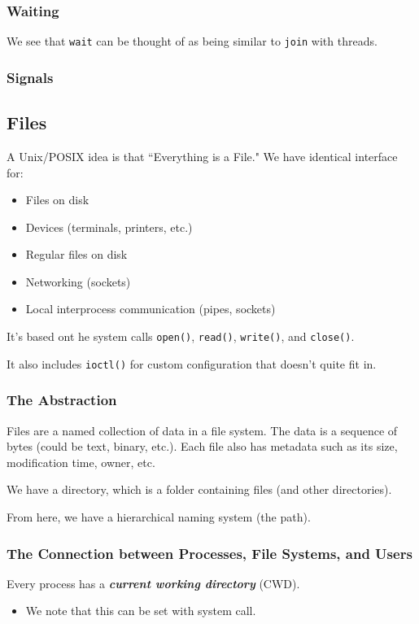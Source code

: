 \documentclass[openany]{book}
\begin{document}
\subsubsection{Waiting}
We see that \texttt{wait} can be thought of as being similar to \texttt{join} with threads. 

\subsubsection{Signals}

\subsection{Files}
A Unix/POSIX idea is that ``Everything is a File." We have identical interface for:
\begin{itemize}
	\item Files on disk
	\item Devices (terminals, printers, etc.)
	\item Regular files on disk
	\item Networking (sockets)
	\item Local interprocess communication (pipes, sockets)
\end{itemize}

It's based ont he system calls \texttt{open()}, \texttt{read()}, \texttt{write()}, and \texttt{close()}.

It also includes \texttt{ioctl()} for custom configuration that doesn't quite fit in.

\subsubsection{The Abstraction}
Files are a named collection of data in a file system. The data is a sequence of bytes (could be text, binary, etc.). Each file also has metadata such as its size, modification time, owner, etc.

We have a directory, which is a folder containing files (and other directories).

From here, we have a hierarchical naming system (the path).

\subsubsection{The Connection between Processes, File Systems, and Users}
Every process has a \textbf{\textit{current working directory}} (CWD).
\begin{itemize}
	\item We note that this can be set with system call.
\end{itemize}
\end{document}
